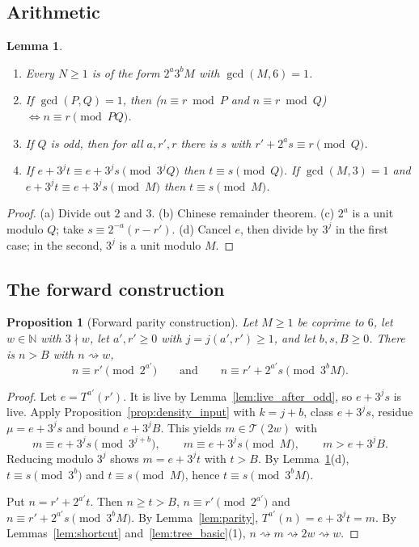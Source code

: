 \documentclass[11pt,reqno,oneside]{amsart}
\theoremstyle{plain}
\newtheorem{proposition}[theorem]{Proposition}
\newtheorem{lemma}[theorem]{Lemma}
\theoremstyle{definition}
\numberwithin{equation}{section}
\newcommand{\N}{\mathbb{N}}
\newcommand{\Tr}{\mathcal{T}}
\newcommand{\reaches}{\rightsquigarrow}
\begin{document}
\subsection*{Arithmetic}
\begin{lemma}\label{lem:arith}
\leavevmode
\begin{enumerate}[label=(\alph*), leftmargin=1.8em]
\item Every $N\ge1$ is of the form $2^a3^bM$ with $\gcd(M,6)=1$.
\item If $\gcd(P,Q)=1$, then ($n\equiv r\bmod P$ and $n\equiv r\bmod Q$) $\iff n\equiv r\pmod{PQ}$.
\item If $Q$ is odd, then for all $a,r',r$ there is $s$ with $r'+2^as\equiv r\pmod Q$.
\item If $e+3^jt\equiv e+3^js\pmod{3^jQ}$ then $t\equiv s\pmod Q$. If $\gcd(M,3)=1$ and $e+3^jt\equiv e+3^js\pmod M$ then $t\equiv s\pmod M$.
\end{enumerate}
\end{lemma}
\begin{proof}
(a) Divide out $2$ and $3$. (b) Chinese remainder theorem. (c) $2^a$ is a unit modulo $Q$; take $s\equiv2^{-a}(r-r')$. (d) Cancel $e$, then divide by $3^j$ in the first case; in the second, $3^j$ is a unit modulo $M$.
\end{proof}

\subsection*{The forward construction}
\begin{proposition}[Forward parity construction]\label{prop:construct}
Let $M\ge1$ be coprime to $6$, let $w\in\N$ with $3\nmid w$, let $a',r'\ge0$ with $j=j(a',r')\ge1$, and let $b,s,B\ge0$. There is $n>B$ with $n\reaches w$,
\[
n\equiv r'\pmod{2^{a'}}\qquad\text{and}\qquad n\equiv r'+2^{a'}s\pmod{3^bM}.
\]
\end{proposition}
\begin{proof}
Let $e=T^{a'}(r')$. It is live by Lemma~\ref{lem:live_after_odd}, so $e+3^js$ is live. Apply Proposition~\ref{prop:density_input} with $k=j+b$, class $e+3^js$, residue $\mu=e+3^js$ and bound $e+3^jB$. This yields $m\in\Tr(2w)$ with
\[
m\equiv e+3^js\pmod{3^{j+b}},\qquad m\equiv e+3^js\pmod M,\qquad m>e+3^jB .
\]
Reducing modulo $3^j$ shows $m=e+3^jt$ with $t>B$. By Lemma~\ref{lem:arith}(d), $t\equiv s\pmod{3^b}$ and $t\equiv s\pmod M$, hence $t\equiv s\pmod{3^bM}$.

Put $n=r'+2^{a'}t$. Then $n\ge t>B$, $n\equiv r'\pmod{2^{a'}}$ and $n\equiv r'+2^{a'}s\pmod{3^bM}$. By Lemma~\ref{lem:parity}, $T^{a'}(n)=e+3^jt=m$. By Lemmas~\ref{lem:shortcut} and~\ref{lem:tree_basic}(1), $n\reaches m\reaches2w\reaches w$.
\end{proof}
\end{document}
